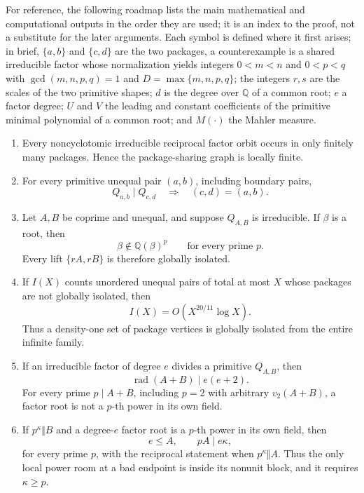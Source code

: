 \documentclass[11pt]{article}
\numberwithin{equation}{section}
\theoremstyle{definition}
\newcommand{\Q}{\mathbb Q}
\begin{document}
For reference, the following roadmap lists the main mathematical and
computational outputs in the order they are used; it is an index to the proof,
not a substitute for the later arguments.  Each symbol is defined where it
first arises; in brief, \(\{a,b\}\) and \(\{c,d\}\) are the two packages, a
counterexample is a shared irreducible factor whose normalization yields
integers \(0<m<n\) and \(0<p<q\) with \(\gcd(m,n,p,q)=1\) and
\(D=\max\{m,n,p,q\}\); the integers \(r,s\) are the scales of the two
primitive shapes; \(d\) is the degree over \(\Q\) of a common root; \(e\) a
factor degree; \(U\) and \(V\) the leading and constant coefficients of the
primitive minimal polynomial of a common root; and \(M(\cdot)\) the Mahler
measure.
\begin{enumerate}[label=(\roman*)]
\item Every noncyclotomic irreducible reciprocal factor orbit occurs in only
finitely many packages.  Hence the package-sharing graph is locally finite.

\item For every primitive unequal pair \((a,b)\), including boundary pairs,
\[
 Q_{a,b}\mid Q_{c,d}\quad\Longrightarrow\quad(c,d)=(a,b).
\]

\item Let \(A,B\) be coprime and unequal, and suppose \(Q_{A,B}\) is
irreducible.  If \(\beta\) is a root, then
\[
 \beta\notin\Q(\beta)^p
 \qquad\text{for every prime }p.
\]
Every lift \(\{rA,rB\}\) is therefore globally isolated.

\item If \(I(X)\) counts unordered unequal pairs of total at most \(X\)
whose packages are not globally isolated, then
\[
 I(X)=O\!\left(X^{20/11}\log X\right).
\]
Thus a density-one set of package vertices is globally isolated from the
entire infinite family.

\item If an irreducible factor of degree \(e\) divides a primitive
\(Q_{A,B}\), then
\[
 \operatorname{rad}(A+B)\mid e(e+2).
\]
For every prime \(p\mid A+B\), including \(p=2\) with arbitrary
\(v_2(A+B)\), a factor root is not a \(p\)-th power in its own field.

\item If \(p^\kappa\Vert B\) and a degree-\(e\) factor root is a
\(p\)-th power in its own field, then
\[
 e\leq A,\qquad pA\mid e\kappa,
\]
for every prime \(p\), with the reciprocal statement when
\(p^\kappa\Vert A\).  Thus the only local power room at a bad endpoint is
inside its nonunit block, and it requires \(\kappa\geq p\).


\end{enumerate}
\end{document}
